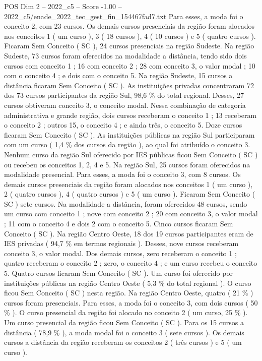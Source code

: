 \begin{textsample}{POS Dim 2 – 2022\_c5 – Score -1.00 – 2022\_c5/enade\_2022\_tec\_gest\_fin\_154467fad7.txt}
Para esses, a moda foi o conceito 2, com 23 cursos.
Os demais cursos presenciais da região foram alocados nos conceitos 1 ( um curso ), 3 ( 18 cursos ), 4 ( 10 cursos ) e 5 ( quatro cursos ).
Ficaram Sem Conceito ( SC ), 24 cursos presenciais na região Sudeste.
Na região Sudeste, 73 cursos foram oferecidos na modalidade a distância, tendo sido dois cursos com conceito 1 ; 16 com conceito 2 ; 28 com conceito 3, o valor modal ; 10 com o conceito 4 ; e dois com o conceito 5.
Na região Sudeste, 15 cursos a distância ficaram Sem Conceito ( SC ).
As instituições privadas concentraram 72 dos 73 cursos participantes da região Sul, 98,6 \% do total regional.
Desses, 27 cursos obtiveram conceito 3, o conceito modal.
Nessa combinação de categoria administrativa e grande região, dois cursos receberam o conceito 1 ; 13 receberam o conceito 2 ; outros 15, o conceito 4 ; e ainda três, o conceito 5.
Doze cursos ficaram Sem Conceito ( SC ).
As instituições públicas na região Sul participaram com um curso ( 1,4 \% dos cursos da região ), ao qual foi atribuído o conceito 3.
Nenhum curso da região Sul oferecido por IES públicas ficou Sem Conceito ( SC ) ou recebeu os conceitos 1, 2, 4 e 5.
Na região Sul, 25 cursos foram oferecidos na modalidade presencial.
Para esses, a moda foi o conceito 3, com 8 cursos.
Os demais cursos presenciais da região foram alocados nos conceitos 1 ( um curso ), 2 ( quatro cursos ), 4 ( quatro cursos ) e 5 ( um curso ).
Ficaram Sem Conceito ( SC ) sete cursos.
Na modalidade a distância, foram oferecidos 48 cursos, sendo um curso com conceito 1 ; nove com conceito 2 ; 20 com conceito 3, o valor modal ; 11 com o conceito 4 e dois 2 com o conceito 5.
Cinco cursos ficaram Sem Conceito ( SC ).
Na região Centro Oeste, 18 dos 19 cursos participantes eram de IES privadas ( 94,7 \% em termos regionais ).
Desses, nove cursos receberam conceito 3, o valor modal.
Dos demais cursos, zero receberam o conceito 1 ; quatro receberam o conceito 2 ; zero, o conceito 4 ; e um curso recebeu o conceito 5.
Quatro cursos ficaram Sem Conceito ( SC ).
Um curso foi oferecido por instituições públicas na região Centro Oeste ( 5,3 \% do total regional ).
O curso ficou Sem Conceito ( SC ) nesta região.
Na região Centro Oeste, quatro ( 21 \% ) cursos foram presenciais.
Para esses, a moda foi o conceito 3, com dois cursos ( 50 \% ).
O curso presencial da região foi alocado no conceito 2 ( um curso, 25 \% ).
Um curso presencial da região ficou Sem Conceito ( SC ).
Para os 15 cursos a distância ( 78,9 \% ), a moda modal foi o conceito 3 ( sete cursos ).
Os demais cursos a distância da região receberam os conceitos 2 ( três cursos ) e 5 ( um curso ).

\end{textsample}
